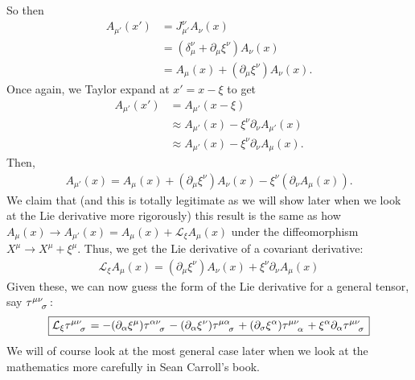 \documentclass{book}
\numberwithin{equation}{section}
\theoremstyle{definition}
\newcommand{\p}{\partial}
\newcommand{\lag}{\mathcal{L}}
\begin{document}
So then
\begin{align}
A_{\mu'}(x') &= J^\nu_{\mu'}A_\nu(x)\\
&= (\delta^\nu_\mu + \p_\mu\xi^\nu )A_\nu(x)\\
&= A_\mu(x) +(\p_\mu \xi^\nu)A_\nu(x).
\end{align}
Once again, we Taylor expand at $x' = x-\xi$ to get 
\begin{align}
A_{\mu'}(x') &= A_{\mu'}(x-\xi)\\
& \approx A_{\mu'}(x) - \xi^\nu \p_\nu A_{\mu'}(x)\\
& \approx A_{\mu'}(x) - \xi^\nu \p_\nu A_{\mu}(x).
\end{align}
Then,
\begin{align}
A_{\mu'}(x) = A_{\mu}(x) + (\p_\mu\xi^\nu)A_\nu(x) - \xi^\nu(\p_\nu A_\mu(x)).
\end{align}
We claim that (and this is totally legitimate as we will show later when we look at the Lie derivative more rigorously) this result is the same as how $A_\mu(x) \to A_{\mu'}(x) = A_{\mu}(x) + \lag_\xi A_\mu(x)$ under the diffeomorphism $X^\mu \to X^\mu+\xi^\mu$. Thus, we get the Lie derivative of a covariant derivative:
\begin{align}
\boxed{\lag_\xi A_\mu(x) = (\p_\mu \xi^\nu)A_\nu(x)   + \xi^\nu \p_\nu A_\mu(x) }
\end{align}
Given these, we can now guess the form of the Lie derivative for a general tensor, say $\tensor{\tau}{^{\mu\nu}_\sigma}$:
\begin{align}
\boxed{\lag_\xi \tensor{\tau}{^{\mu\nu}_\sigma} = -(\p_\alpha\xi^\mu)\tensor{\tau}{^{\alpha\nu}_\sigma}
-(\p_\alpha \xi^\nu)\tensor{\tau}{^{\mu\alpha}_\sigma}
+(\p_\sigma \xi^\alpha)\tensor{\tau}{^{\mu\nu}_\alpha}
+ \xi^\alpha \p_\alpha \tensor{\tau}{^{\mu\nu}_\sigma}
 }
\end{align}
We will of course look at the most general case later when we look at the mathematics more carefully in Sean Carroll's book. \\
\end{document}
